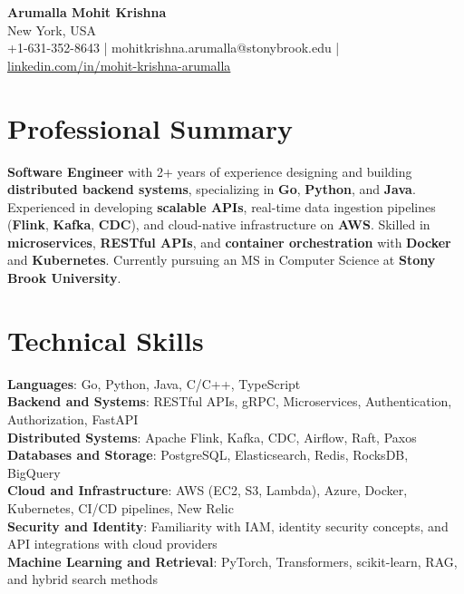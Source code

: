 \documentclass[letterpaper,11pt]{article}
\begin{document}
\begin{center}
  {\Large \textbf{Arumalla Mohit Krishna}} \\
  New York, USA \\
  +1-631-352-8643 \enspace | \enspace mohitkrishna.arumalla@stonybrook.edu \enspace | \enspace \href{https://www.linkedin.com/in/mohit-krishna-arumalla}{linkedin.com/in/mohit-krishna-arumalla}
\end{center}

\section{Professional Summary}
  \begin{itemize}[leftmargin=0.15in, label={}]
    \small{\item{
     \textbf{Software Engineer} with 2+ years of experience designing and building \textbf{distributed backend systems}, specializing in \textbf{Go}, \textbf{Python}, and \textbf{Java}. Experienced in developing \textbf{scalable APIs}, real-time data ingestion pipelines (\textbf{Flink}, \textbf{Kafka}, \textbf{CDC}), and cloud-native infrastructure on \textbf{AWS}. Skilled in \textbf{microservices}, \textbf{RESTful APIs}, and \textbf{container orchestration} with \textbf{Docker} and \textbf{Kubernetes}. Currently pursuing an MS in Computer Science at \textbf{Stony Brook University}.
    }}
  \end{itemize}
\vspace{-16pt}

\section{Technical Skills}
 \begin{itemize}[leftmargin=0.15in, label={}]
    \small{\item{
     \textbf{Languages}: Go, Python, Java, C/C++, TypeScript \\
     \textbf{Backend and Systems}: RESTful APIs, gRPC, Microservices, Authentication, Authorization, FastAPI \\
     \textbf{Distributed Systems}: Apache Flink, Kafka, CDC, Airflow, Raft, Paxos \\
     \textbf{Databases and Storage}: PostgreSQL, Elasticsearch, Redis, RocksDB, BigQuery \\
     \textbf{Cloud and Infrastructure}: AWS (EC2, S3, Lambda), Azure, Docker, Kubernetes, CI/CD pipelines, New Relic \\
     \textbf{Security and Identity}: Familiarity with IAM, identity security concepts, and API integrations with cloud providers \\
     \textbf{Machine Learning and Retrieval}: PyTorch, Transformers, scikit-learn, RAG, and hybrid search methods
    }}
 \end{itemize}
\vspace{-16pt}
\end{document}
